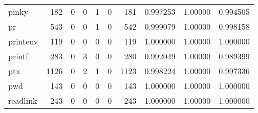 \begin{longtable}{lrrrrrrrrr}
pinky     &                    182 &                                  0 &                                 0 &                                1 &                                 0 &                             181 &                                0.997253 &                                1.00000 &                             0.994505 \\
pr        &                    543 &                                  0 &                                 0 &                                1 &                                 0 &                             542 &                                0.999079 &                                1.00000 &                             0.998158 \\
printenv  &                    119 &                                  0 &                                 0 &                                0 &                                 0 &                             119 &                                1.000000 &                                1.00000 &                             1.000000 \\
printf    &                    283 &                                  0 &                                 3 &                                0 &                                 0 &                             280 &                                0.992049 &                                1.00000 &                             0.989399 \\
ptx       &                   1126 &                                  0 &                                 2 &                                1 &                                 0 &                            1123 &                                0.998224 &                                1.00000 &                             0.997336 \\
pwd       &                    143 &                                  0 &                                 0 &                                0 &                                 0 &                             143 &                                1.000000 &                                1.00000 &                             1.000000 \\
readlink  &                    243 &                                  0 &                                 0 &                                0 &                                 0 &                             243 &                                1.000000 &                                1.00000 &                             1.000000 \\

\end{longtable}
